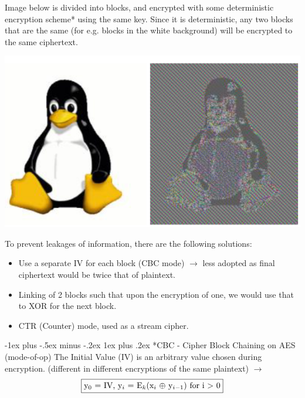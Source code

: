 \documentclass[10pt,landscape]{article}
\makeatletter
\renewcommand{\subsubsection}{\@startsection{subsubsection}{3}{0mm}%
                                {-1ex plus -.5ex minus -.2ex}%
                                {1ex plus .2ex}%
                                {\normalfont\small\bfseries}}
\makeatother
\begin{document}
\begin{multicols*}{3}
\begin{center}
\end{center} 

Image below is divided into blocks, and encrypted with some
deterministic encryption scheme* using the same key. Since it is deterministic, any
two blocks that are the same (for e.g. blocks in the white background) will be
encrypted to the same ciphertext.
\begin{center}
    \includegraphics[scale=0.5]{images/penguin.png} 
\end{center}

To prevent leakages of information, there are the following solutions:
\begin{itemize}[noitemsep,wide=0pt, leftmargin=\dimexpr{} + 2\relax]
    \item Use a separate IV for each block (CBC mode) $\rightarrow$ less adopted as final ciphertext would be twice that of plaintext.
    \item Linking of 2 blocks such that upon the encryption of one, we would use that to XOR for the next block.
    \item CTR (Counter) mode, used as a stream cipher.
\end{itemize}

\subsubsection*{CBC - Cipher Block Chaining on AES (mode-of-op)}
The Initial Value (IV) is an arbitrary value chosen during encryption. (different in different encryptions of the same plaintext) $\rightarrow$
\begin{subequations}
    \framebox{y$_0$ = IV, y$_i$ = E$_k$(x$_i$ $\oplus$ y$_{i-1}$)  for i $>$ 0} 
\end{subequations}


\end{multicols*}
\end{document}
